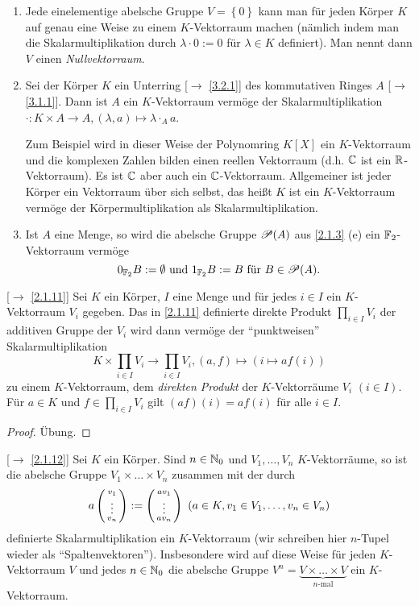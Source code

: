 \documentclass[../../main.tex]{subfiles}
\begin{document}
\begin{bsp}\label{6.1.4}
\begin{enumerate}[\normalfont(a)]
\item Jede einelementige abelsche Gruppe $V=\left\{0\right\}$ kann man für jeden Körper $K$ auf genau eine Weise zu einem $K$-Vektorraum machen (nämlich indem man die Skalarmultiplikation durch $\lambda\cdot 0 := 0$ für $\lambda \in K$ definiert). Man nennt dann $V$ einen \emph{Nullvektorraum}.
\item Sei der Körper $K$ ein Unterring [$\to$ \ref{3.2.1}] des kommutativen Ringes $A$ [$\to$ \ref{3.1.1}]. Dann ist $A$ ein $K$-Vektorraum vermöge der Skalarmultiplikation $\cdot:K\times A\to A, (\lambda, a) \mapsto \lambda\cdot_A a$.

Zum Beispiel wird in dieser Weise der Polynomring $K[X]$ ein $K$-Vektorraum und die komplexen Zahlen bilden einen reellen Vektorraum (d.h. $\mathbb C$ ist ein $\mathbb R$-Vektorraum). Es ist $\mathbb C$ aber auch ein $\mathbb C$-Vektorraum. Allgemeiner ist jeder Körper ein Vektorraum über sich selbst, das heißt $K$ ist ein $K$-Vektorraum vermöge der Körpermultiplikation als Skalarmultiplikation.
\item Ist $A$ eine Menge, so wird die abelsche Gruppe $\mathcal P(A)$ aus \ref{2.1.3} (e) ein $\mathbb F_2$-Vektorraum vermöge
$$0_{\mathbb F_2}B := \emptyset \text{ und } 1_{\mathbb F_2}B := B \text{ für } B\in \mathcal P(A).$$
\end{enumerate}
\end{bsp}

\begin{satdef}\label{6.1.5}
{\rm[$\to$ \ref{2.1.11}]} Sei $K$ ein Körper, $I$ eine Menge und für jedes $i\in I$ ein $K$-Vektorraum $V_i$ gegeben. Das in \ref{2.1.11} definierte direkte Produkt $\prod_{i\in I}V_i$ der additiven Gruppe der $V_i$ wird dann vermöge der "`punktweisen"' Skalarmultiplikation
$$K\times \prod_{i\in I}V_i\to \prod_{i\in I}V_i, (a,f)\mapsto (i\mapsto af(i))$$
zu einem $K$-Vektorraum, dem \emph{direkten Produkt} der $K$-Vektorräume $V_i$ $(i\in I)$. Für $a\in K$ und $f\in \prod_{i\in I}V_i$ gilt $(af)(i) = a f(i)$ für alle $i\in I$.
\end{satdef}
\begin{proof}
Übung.
\end{proof}

\begin{kor}\label{6.1.6}
{\rm[$\to$ \ref{2.1.12}]} Sei $K$ ein Körper. Sind $n\in \mathbb N_0$ und $V_1,\ldots,V_n$ $K$-Vektorräume, so ist die abelsche Gruppe $V_1\times \ldots\times V_n$ zusammen mit der durch
$$a\left(\begin{smallmatrix}v_1\\\vdots\\v_n\end{smallmatrix}\right) := \left(\begin{smallmatrix}av_1\\\vdots\\av_n\end{smallmatrix}\right) ~(a\in K, v_1\in V_1, \ldots, v_n\in V_n)$$
definierte Skalarmultiplikation ein $K$-Vektorraum (wir schreiben hier $n$-Tupel wieder als "`Spaltenvektoren"'). Insbesondere wird auf diese Weise für jeden $K$-Vektorraum $V$ und jedes $n\in\mathbb N_0$ die abelsche Gruppe $V^n = \underbrace{V\times \ldots\times V}_{n\text{-mal}}$ ein $K$-Vektorraum.
\end{kor}
\end{document}
